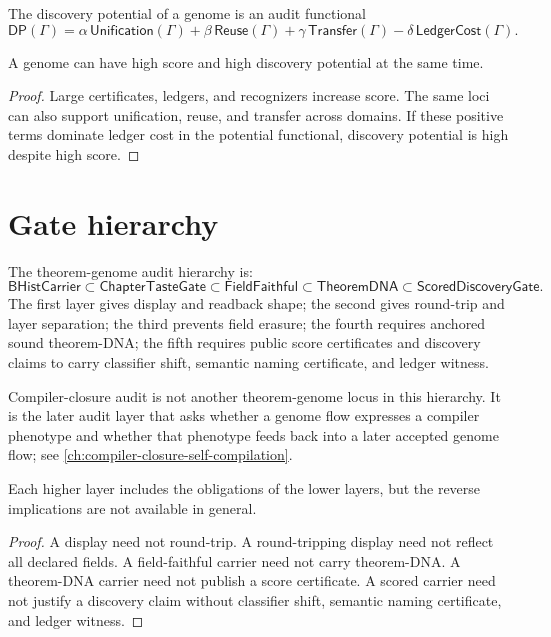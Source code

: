 \begin{definition}
\label{def:theorem-genome-discovery-potential}
The discovery potential of a genome is an audit functional
$$
\mathsf{DP}(\Gamma)=
\alpha\,\mathsf{Unification}(\Gamma)
+\beta\,\mathsf{Reuse}(\Gamma)
+\gamma\,\mathsf{Transfer}(\Gamma)
-\delta\,\mathsf{LedgerCost}(\Gamma).
$$
\end{definition}

\begin{theorem}
\label{thm:theorem-genome-high-potential-high-complexity}
A genome can have high score and high discovery potential at the same time.
\end{theorem}
\begin{proof}
Large certificates, ledgers, and recognizers increase score. The same loci can
also support unification, reuse, and transfer across domains. If these positive
terms dominate ledger cost in the potential functional, discovery potential is
high despite high score.
\end{proof}

\section{Gate hierarchy}
\label{sec:theorem-genome-gate-hierarchy}

\begin{definition}
\label{def:theorem-genome-gate-hierarchy}
The theorem-genome audit hierarchy is:
$$
\mathsf{BHistCarrier}
\subset
\mathsf{ChapterTasteGate}
\subset
\mathsf{FieldFaithful}
\subset
\mathsf{TheoremDNA}
\subset
\mathsf{ScoredDiscoveryGate}.
$$
The first layer gives display and readback shape; the second gives round-trip
and layer separation; the third prevents field erasure; the fourth requires
anchored sound theorem-DNA; the fifth requires public score certificates and
discovery claims to carry classifier shift, semantic naming certificate, and
ledger witness.
\end{definition}

Compiler-closure audit is not another theorem-genome locus in this hierarchy.
It is the later audit layer that asks whether a genome flow expresses a
compiler phenotype and whether that phenotype feeds back into a later accepted
genome flow; see \autoref{ch:compiler-closure-self-compilation}.

\begin{theorem}
\label{thm:theorem-genome-gate-hierarchy-strict}
Each higher layer includes the obligations of the lower layers, but the reverse
implications are not available in general.
\end{theorem}
\begin{proof}
A display need not round-trip. A round-tripping display need not reflect all
declared fields. A field-faithful carrier need not carry theorem-DNA. A
theorem-DNA carrier need not publish a score certificate. A scored carrier need
not justify a discovery claim without classifier shift, semantic naming
certificate, and ledger witness.
\end{proof}

